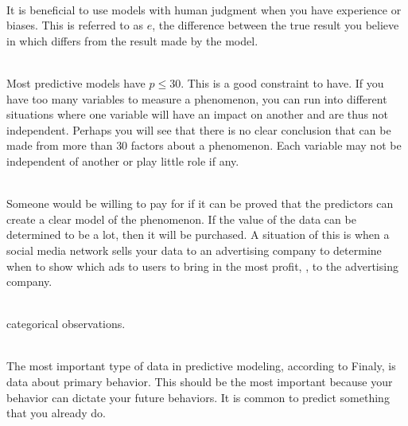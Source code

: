 \documentclass[12pt]{article}
\begin{document}
\begin{enumerate}
 \\
It is beneficial to use models with human judgment when you have experience or biases. This is referred to as $e$, the difference between the true result you believe in which differs from the result made by the model.

 \\
Most predictive models have $p \leq 30$. This is a good constraint to have. If you have too many variables to measure a phenomenon, you can run into different situations where one variable will have an impact on another and are thus not independent. Perhaps you will see that there is no clear conclusion that can be made from more than $30$ factors about a phenomenon. Each variable may not be independent of another or play little role if any. 


 \\
Someone would be willing to pay for  if it can be proved that the predictors can create a clear model of the phenomenon. If the value of the data can be determined to be a lot, then it will be purchased. A situation of this is when a social media network sells your data to an advertising company to determine when to show which ads to users to bring in the most profit, , to the advertising company. 

 \\
categorical observations.

 \\
The most important type of data in predictive modeling, according to Finaly, is data about primary behavior. This should be the most important because your behavior can dictate your future behaviors. It is common to predict something that you already do. 


\end{enumerate}
\end{document}
